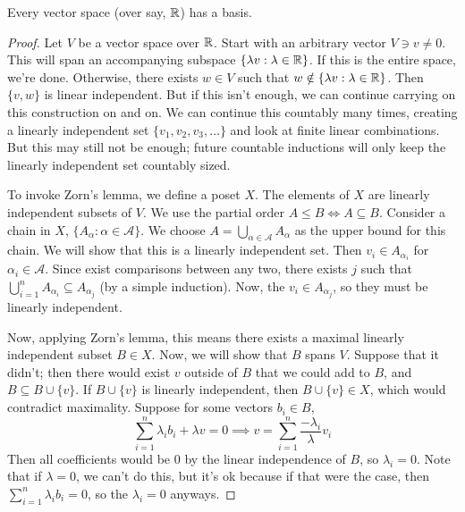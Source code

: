\begin{theorem}
    Every vector space (over say, $\operatorname{\mathbb{R}}$) has a basis.
    \begin{proof}
        Let $V$ be a vector space over $\operatorname{\mathbb{R}}$. Start with an arbitrary vector $V \ni v \neq 0$. This will span an accompanying
        subspace $\{\lambda v : \lambda \in \operatorname{\mathbb{R}}\}$. If this is the entire space, we're done.
        Otherwise, there exists $w \in V$ such that $w \notin \{\lambda v : \lambda \in \operatorname{\mathbb{R}}\}$.
        Then $\{v, w\}$ is linear independent. But if this isn't enough, we can continue carrying on this
        construction on and on. We can continue this countably many times, creating a linearly independent
        set $\{v_1, v_2, v_3, \dots\}$ and look at finite linear combinations. But this may still not be enough; future
        countable inductions will only keep the linearly independent set countably sized.
        
        To invoke Zorn's lemma, we define a poset $X$. The elements of $X$ are linearly independent subsets of $V$.
        We use the partial order $A \le B \iff A \subseteq B$. Consider a chain in $X$, $\{A_{\alpha}: \alpha \in \mathcal{A}\}$.
        We choose $A = \bigcup_{\alpha \in \mathcal{A}} A_{\alpha}$ as the upper bound for this chain.
        We will show that this is a linearly independent set. Then $v_i \in A_{\alpha_i}$ for $\alpha_i \in \mathcal{A}$.
        Since exist comparisons between any two, there exists $j$ such that $\bigcup_{i = 1}^{n} A_{\alpha_i} \subseteq A_{\alpha_j}$ (by a simple induction).
        Now, the $v_i \in A_{\alpha_j}$, so they must be linearly independent.

        Now, applying Zorn's lemma, this means there exists a maximal linearly independent subset $B \in X$.
        Now, we will show that $B$ spans $V$. Suppose that it didn't; then there would exist $v$ outside of $B$
        that we could add to $B$, and $B \subseteq B \cup \{v\}$. If $B \cup \{v\}$ is linearly independent,
        then $B \cup \{v\} \in X$, which would contradict maximality.
        Suppose for some vectors $b_i \in B$,
        \[ \sum_{i = 1}^n \lambda_i b_i + \lambda v = 0 \implies v = \sum_{i = 1}^n \frac{-\lambda_i}{\lambda} v_i \]
        Then all coefficients would be $0$ by the linear independence of $B$, so $\lambda_i = 0$. Note that if $\lambda = 0$,
        we can't do this, but it's ok because if that were the case, then $\sum_{i = 1}^n \lambda_i b_i = 0$, so the
        $\lambda_i = 0$ anyways.
    \end{proof}
\end{theorem}

